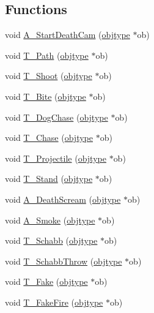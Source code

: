 \subsection*{Functions}
\begin{DoxyCompactItemize}
\item 
void \hyperlink{WL__ACT2_8C_a79dd40f11ba56398bf7617f7d05d3967}{A\_\-StartDeathCam} (\hyperlink{structobjstruct}{objtype} $\ast$ob)
\item 
void \hyperlink{WL__ACT2_8C_a297fbc8b826bdbe6e04f2fe6a0c2a128}{T\_\-Path} (\hyperlink{structobjstruct}{objtype} $\ast$ob)
\item 
void \hyperlink{WL__ACT2_8C_aef356ee8bcc0d70959cad379dc991266}{T\_\-Shoot} (\hyperlink{structobjstruct}{objtype} $\ast$ob)
\item 
void \hyperlink{WL__ACT2_8C_a550a43a3c7dddea4766d2814e8418959}{T\_\-Bite} (\hyperlink{structobjstruct}{objtype} $\ast$ob)
\item 
void \hyperlink{WL__ACT2_8C_a1723fcb57e315538ff5dbe4f9b5f28a0}{T\_\-DogChase} (\hyperlink{structobjstruct}{objtype} $\ast$ob)
\item 
void \hyperlink{WL__ACT2_8C_a2d2e0445a6661b21ec497072f261b2c0}{T\_\-Chase} (\hyperlink{structobjstruct}{objtype} $\ast$ob)
\item 
void \hyperlink{WL__ACT2_8C_a1f08a6f94411997213ae0175f6dcf3f4}{T\_\-Projectile} (\hyperlink{structobjstruct}{objtype} $\ast$ob)
\item 
void \hyperlink{WL__ACT2_8C_ad1603fe2f1e9a66f94be47e11cfe4ba8}{T\_\-Stand} (\hyperlink{structobjstruct}{objtype} $\ast$ob)
\item 
void \hyperlink{WL__ACT2_8C_add91c8a8200e146df8af577343b8d553}{A\_\-DeathScream} (\hyperlink{structobjstruct}{objtype} $\ast$ob)
\item 
void \hyperlink{WL__ACT2_8C_ae264d8e741aaea95af2fefed42274977}{A\_\-Smoke} (\hyperlink{structobjstruct}{objtype} $\ast$ob)
\item 
void \hyperlink{WL__ACT2_8C_ab666f1455bb55512f01418413679962a}{T\_\-Schabb} (\hyperlink{structobjstruct}{objtype} $\ast$ob)
\item 
void \hyperlink{WL__ACT2_8C_a191f82d6f98ed7b93e8aa53ad120bf73}{T\_\-SchabbThrow} (\hyperlink{structobjstruct}{objtype} $\ast$ob)
\item 
void \hyperlink{WL__ACT2_8C_a5f8b7b86236c7cc444781f34eba13965}{T\_\-Fake} (\hyperlink{structobjstruct}{objtype} $\ast$ob)
\item 
void \hyperlink{WL__ACT2_8C_a34c8470b8f0ae8905dd8f3129e10ce32}{T\_\-FakeFire} (\hyperlink{structobjstruct}{objtype} $\ast$ob)

\end{DoxyCompactItemize}
